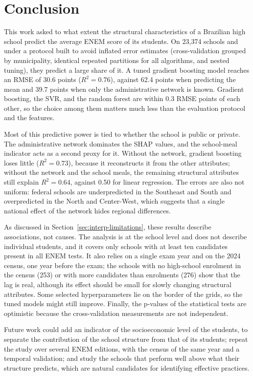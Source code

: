 \section{Conclusion}
\label{sec:conclusion}

This work asked to what extent the structural characteristics of a Brazilian high school predict
the average ENEM score of its students. On 23{,}374 schools and under a protocol built to avoid
inflated error estimates (cross-validation grouped by municipality, identical repeated partitions
for all algorithms, and nested tuning), they predict a large share of it. A tuned gradient boosting
model reaches an RMSE of 30.6 points ($R^2 = 0.76$), against 62.4 points when predicting the mean
and 39.7 points when only the administrative network is known. Gradient boosting, the SVR, and the
random forest are within 0.3 RMSE points of each other, so the choice among them matters much less
than the evaluation protocol and the features.

Most of this predictive power is tied to whether the school is public or private. The
administrative network dominates the SHAP values, and the school-meal indicator acts as a second
proxy for it. Without the network, gradient boosting loses little ($R^2 = 0.73$), because it
reconstructs it from the other attributes; without the network and the school meals, the
remaining structural attributes still explain $R^2 = 0.64$, against 0.50 for linear regression.
The errors are also not uniform: federal schools are underpredicted in the Southeast and South and
overpredicted in the North and Center-West, which suggests that a single national effect of the
network hides regional differences.

As discussed in Section~\ref{sec:interp-limitations}, these results describe associations, not
causes. The analysis is at
the school level and does not describe individual students, and it covers only schools with at
least ten candidates present in all ENEM tests. It also relies on a single exam year and on the
2024 census, one year before the exam; the schools with no high-school enrolment in the census
(253) or with more candidates than enrolments (276) show that the lag is real, although its effect
should be small for slowly changing structural attributes. Some selected hyperparameters lie on the border of the grids, so the tuned
models might still improve. Finally, the p-values of the statistical tests are optimistic because
the cross-validation measurements are not independent.

Future work could add an indicator of the socioeconomic level of the students, to separate the
contribution of the school structure from that of its students; repeat the study over several
ENEM editions, with the census of the same year and a temporal validation; and study the schools
that perform well above what their structure predicts, which are natural candidates for
identifying effective practices.
